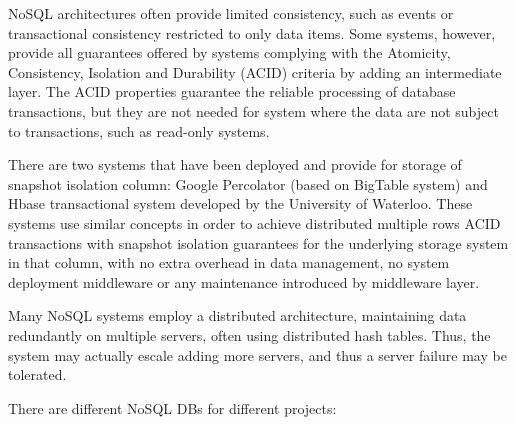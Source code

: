 NoSQL architectures often provide limited consistency, such as events or transactional consistency restricted to only data items. Some systems, however, provide all guarantees offered by
systems complying with the Atomicity, Consistency, Isolation and Durability (ACID) criteria
by adding an intermediate layer.
The ACID properties guarantee the reliable processing of database transactions, but they are not needed for system where the data are not subject to transactions, such as read-only systems.

There are two systems that have been deployed and provide for storage of snapshot isolation column: Google Percolator (based on BigTable system) and Hbase transactional system developed by the University of Waterloo. These systems use similar concepts in order to achieve distributed multiple rows ACID transactions with snapshot isolation guarantees for the underlying storage system in that column,
with %
no extra overhead in data management, no system deployment middleware or any maintenance introduced by middleware layer. 

Many %
NoSQL systems employ a distributed architecture, maintaining data redundantly on multiple servers, often using distributed hash tables. Thus, the system may actually escale adding more servers, and thus a server failure may be tolerated. 

There are different NoSQL DBs for different projects:

